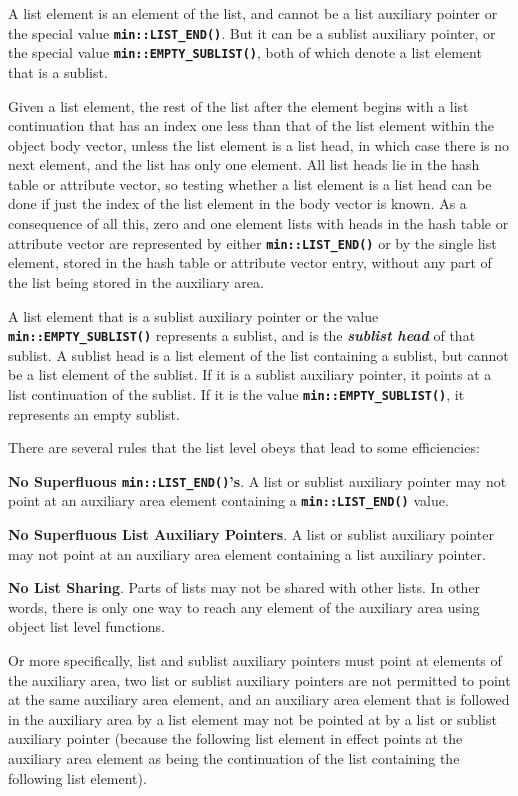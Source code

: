 \documentclass[12pt]{article}
\newcommand{\TT}[1]{{\tt \bfseries #1}}
\newcommand{\key}[1]{{\bf \em #1}\index{#1}}
\newcommand{\EOL}{\penalty \exhyphenpenalty}
\newenvironment{indpar}[1][0.3in]%
	{\begin{list}{}%
		     {\setlength{\itemsep}{0in}%
		      \setlength{\topsep}{0in}%
		      \setlength{\parsep}{1ex}%
		      \setlength{\labelwidth}{#1}%
		      \setlength{\leftmargin}{#1}%
		      \addtolength{\leftmargin}{\labelsep}}%
	 \item}%
	{\end{list}}
\begin{document}
A list element is an element of the list, and cannot be a list auxiliary
pointer or the special value \TT{min::LIST\_END()}.  But it can be
a sublist auxiliary pointer, or the special value \TT{min::EMPTY\_SUBLIST()},
both of which denote a list element that is a sublist.

Given a list element, the rest of the list after the element begins with
a list continuation that has an index one less than that of the list
element within the object body vector, unless the list element is a
list head, in which case there is no next element, and the list has only
one element.  All list heads lie in the hash table or attribute vector,
so testing whether a list element is a list head can be done if just the
index of the list element in the body vector is known.
As a consequence of all this,
zero and one element lists with heads in the hash table
or attribute vector are represented by either \TT{min::\EOL LIST\_\EOL END()}
or by the single list element, stored in the hash table or attribute
vector entry, without any part of the list being stored in the
auxiliary area.

A list element
that is a sublist auxiliary pointer or the value \TT{min::EMPTY\_SUBLIST()}
represents a sublist, and is the \key{sublist head} of that sublist.  A
sublist head is a list element of the list containing a sublist,
but cannot be a list element of the sublist.
If it is a sublist auxiliary pointer,
it points at a list continuation of the sublist.  If it is the
value \TT{min::EMPTY\_SUBLIST()}, it represents an empty sublist.

There are several rules that the list level obeys that lead to
some efficiencies:

\begin{indpar}
{\bf No Superfluous \TT{\bf min::LIST\_END()}'s}.%
\index{superfluous LIST_END()@superfluous \TT{LIST\_END()}}%
\label{NO-SUPERFLUOUS-LIST}
A list or sublist auxiliary pointer may not point at an auxiliary
area element containing a \TT{min::LIST\_END()} value.

{\bf No Superfluous List Auxiliary Pointers}.%
A list or sublist auxiliary pointer may not point at an auxiliary
area element containing a list auxiliary pointer.

{\bf No List Sharing}.%
Parts of lists may not be shared with other lists.  In other words,
there is only one way to reach any element of the auxiliary area
using object list level functions.

Or more specifically, list and sublist
auxiliary pointers must point at elements of the auxiliary area,
two list or sublist auxiliary pointers are not permitted to point
at the same auxiliary
area element, and an auxiliary area element that is followed
in the auxiliary area by a list element may not be pointed at by
a list or sublist auxiliary pointer (because the following list element
in effect points at the auxiliary area element as being the
continuation of the list containing the following list element).
\end{indpar}
\end{document}
